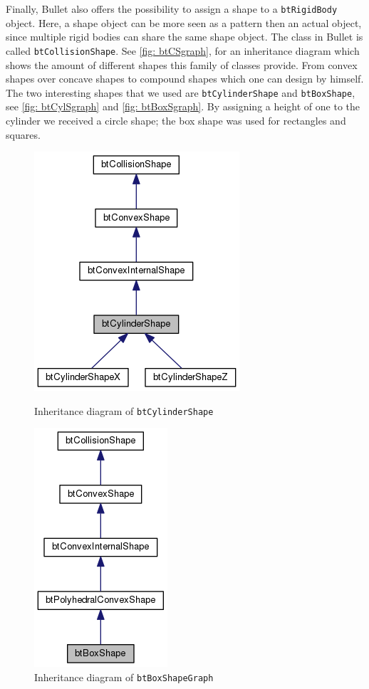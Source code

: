 Finally, Bullet also offers the possibility to assign a shape to a \texttt{btRigidBody} object. Here, a shape object can be more seen as a pattern then an actual object, since multiple rigid bodies can share the same shape object. The class in Bullet is called \texttt{btCollisionShape}. See \autoref{fig: btCSgraph}, for an inheritance diagram which shows the amount of different shapes this family of classes provide. From convex shapes over concave shapes to compound shapes which one can design by himself. The two interesting shapes that we used are \texttt{btCylinderShape} and \texttt{btBoxShape}, see \autoref{fig: btCylSgraph} and \autoref{fig: btBoxSgraph}. By assigning a height of one to the cylinder we received a circle shape; the box shape was used for rectangles and squares.
\begin{figure}[ht]
\centering
\begin{minipage}{.45\linewidth}
\centering
\includegraphics[scale=0.5]{img/RigidBodies/btCylinderShapeGraph.png}
\caption{Inheritance diagram of \texttt{btCylinderShape}}
\label{fig: btCylSgraph}
\end{minipage}
\hspace{.05\linewidth}
\begin{minipage}{.45\linewidth}
\centering
\includegraphics[scale=0.5]{img/RigidBodies/btBoxShapeGraph.png}
\caption{Inheritance diagram of \texttt{btBoxShapeGraph}}
\label{fig: btBoxSgraph}
\end{minipage}
\end{figure}

